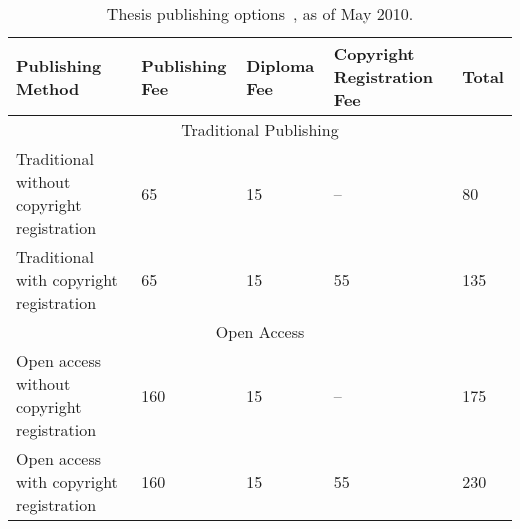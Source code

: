 \begin{table}[htbp]
\centering
\caption[Thesis Publishing Options]{Thesis publishing options~\cite{mudd2009}, as of May 2010. }
\label{table:pastwork:publishing}
\begin{tabular}{p{} p{} p{} p{} p{}}
\toprule
\textbf{Publishing Method} & \textbf{Publishing Fee}
 & \textbf{Diploma Fee} & \textbf{Copyright Registration Fee} & \textbf{Total} \\
\midrule
\multicolumn{5}{c}{Traditional Publishing}\\
\midrule

Traditional without copyright registration
& 65 & 15 & -- & 80 \\[0.2em]

Traditional with copyright registration
& 65 & 15 & 55 & 135 \\[0.2em]

\midrule
\multicolumn{5}{c}{Open Access}\\
\midrule

Open access without copyright registration
& 160 & 15 & -- & 175 \\[0.2em]

Open access with copyright registration
& 160 & 15 & 55 & 230 \\

\bottomrule
\end{tabular}
\end{table}